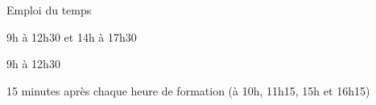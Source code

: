 \begin{frame}{Emploi du temps}
  \begin{description}[<+->]
    \item[14 janvier 2021] 9h à 12h30 et 14h à 17h30
    \item[15 janvier 2021] 9h à 12h30
    \item[Pauses] 15 minutes après chaque heure de formation (à 10h, 11h15, 15h et 16h15)
  \end{description}
\end{frame}
